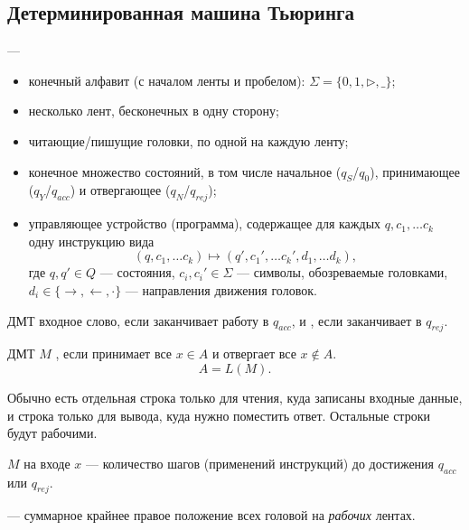 \subsection{Детерминированная машина Тьюринга}
\begin{defn}
	 ---
	\begin{itemize}[noitemsep]
		\item конечный алфавит (с началом ленты и пробелом): $ \Sigma  = \{0, 1, \triangleright, \_\}$;
		\item несколько лент, бесконечных в одну сторону;
		\item читающие/пишущие головки, по одной на каждую ленту;
		\item конечное множество состояний, в том числе начальное ($ q_S$/$q_0$), принимающее ($ q_Y $/$ q_{acc}$) и отвергающее ($ q_N$/$ q_{rej}$);
		\item управляющее устройство (программа), содержащее для каждых $ q, c_1, \ldots c_k$ одну инструкцию вида
			\[
				(q, c_1, \ldots c_k) \mapsto (q', c_1', \ldots c_k', d_1, \ldots d_k)
			,\]
			где $ q, q' \in Q$ --- состояния, $ c_i, c_i' \in \Sigma $ --- символы, обозреваемые головками, $ d_i \in \{ \to , \leftarrow, \cdot  \}$ --- направления движения головок.
	\end{itemize}

	ДМТ  входное слово, если заканчивает работу в $ q_{acc}$, и , если заканчивает в $ q_{rej}$.

	ДМТ $ M$ , если принимает все $ x \in A$ и отвергает все $ x \not\in A$.
	\[
		A = L(M)
	.\]
\end{defn}
\begin{note}
	Обычно есть отдельная строка только для чтения, куда записаны входные данные, и строка только для вывода, куда нужно поместить ответ. Остальные строки будут рабочими.
\end{note}

\begin{defn}
	  $ M$ на входе $ x$ --- количество шагов (применений инструкций) до достижения $ q_{acc}$ или $ q_{rej}$.

	\noindent
	  --- суммарное крайнее правое положение всех головой на \textit{рабочих} лентах.
\end{defn}

